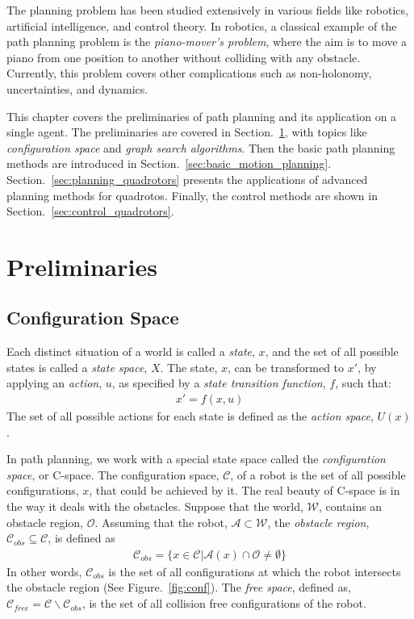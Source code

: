 The planning problem has been studied extensively in various fields like robotics, artificial intelligence, and control theory. In robotics, a classical example of the path planning problem is the \textit{piano-mover's problem}, where the aim is to move a piano from one position to another without colliding with any obstacle. Currently, this problem covers other complications such as non-holonomy, uncertainties, and dynamics.

This chapter covers the preliminaries of path planning and its application on a single agent. The preliminaries are covered in Section.~\ref{sec:prelims}, with topics like \textit{configuration space} and \textit{graph search algorithms}. Then the basic path planning methods are introduced in Section.~\ref{sec:basic_motion_planning}. Section.~\ref{sec:planning_quadrotors} presents the applications of advanced planning methods for quadrotos. Finally, the control methods are shown in Section.~\ref{sec:control_quadrotors}.
\section{Preliminaries}
\label{sec:prelims}
\subsection{Configuration Space}
\label{sec:config_space}
Each distinct situation of a world is called a \textit{state}, $x$, and the set of all possible states is called a \textit{state space}, $X$. The state, $x$, can be transformed to $x'$, by applying an \textit{action}, $u$, as specified by a \textit{state transition function}, $f$, such that:
\begin{align}
	x' = f(x,u)
\end{align}
The set of all possible actions for each state is defined as the \textit{action space}, $U(x)$.

In path planning, we work with a special state space called the \textit{configuration space}, or C-space. The configuration space, $\mathcal{C}$, of a robot is the set of all possible configurations, $x$, that could be achieved by it. The real beauty of C-space is in the way it deals with the obstacles. Suppose that the world, $\mathcal{W}$, contains an obstacle region, $\mathcal{O}$. Assuming that the robot, $\mathcal{A}\subset\mathcal{W}$, the \textit{obstacle region}, $\mathcal{C}_{obs}\subseteq\mathcal{C}$, is defined as
\begin{align}
	\mathcal{C}_{obs} = \{x\in\mathcal{C} | \mathcal{A}(x)\cap\mathcal{O}\neq\emptyset\}
\end{align}
In other words, $\mathcal{C}_{obs}$ is the set of all configurations at which the robot intersects the obstacle region (See Figure.~\ref{fig:conf}). The \textit{free space}, defined as, $\mathcal{C}_{free} = \mathcal{C} \backslash  \mathcal{C}_{obs}$, is the set of all collision free configurations of the robot. 

